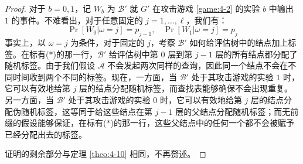 \begin{proof}
对于 $b=0,1$，记 $W_b$ 为 $\mathcal{B}'$ 就 $G'$ 在攻击游戏 \ref{game:4-2} 的实验 $b$ 中输出 $1$ 的事件。不难看出，对于任意固定的 $j=1,\dots,\ell$，我们有：
\[
\Pr[W_0|\omega=j]=p_{j-1},~~~~
\Pr[W_1|\omega=j]=p_j
\]
事实上，以 $\omega=j$ 为条件，对于固定的 $j$，考察 $\mathcal{B}'$ 如何给评估树中的结点加上标签。在标有($*$)的那一行，$\mathcal{B}'$ 给评估树中第 $0$ 层到第 $j-1$ 层的所有结点都分配了随机标签。由于我们假设 $\mathcal{A}$ 不会发起两次同样的查询，因此同一个结点不会在不同时间收到两个不同的标签。现在，一方面，当 $\mathcal{B}'$ 处于其攻击游戏的实验 $1$ 时，它可以有效地给第 $j$ 层的结点分配随机标签，而查找表能够确保不会出现重复。另一方面，当 $\mathcal{B}'$ 处于其攻击游戏的实验 $0$ 时，它可以有效地给第 $j$ 层的结点分配伪随机标签，这等同于给这些结点在第 $j-1$ 层的父结点分配随机标签；而无前缀的假设能够保证，在标有($*$)的那一行，这些父结点中的任何一个都不会被赋予已经分配出去的标签。

证明的剩余部分与定理 \ref{theo:4-10} 相同，不再赘述。
\end{proof}